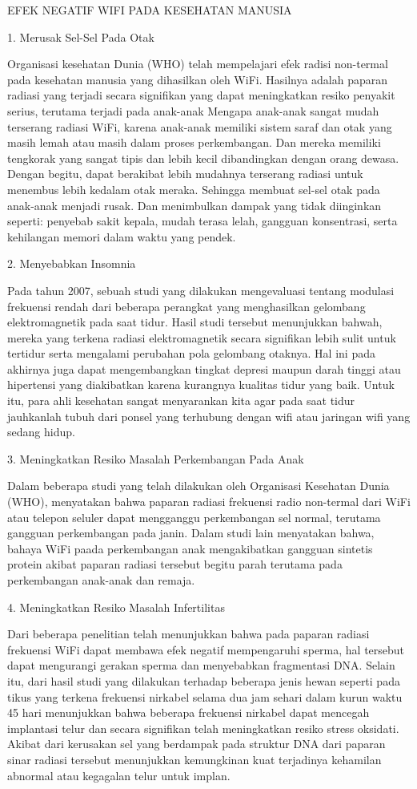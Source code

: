 EFEK NEGATIF WIFI PADA KESEHATAN MANUSIA

1. Merusak Sel-Sel Pada Otak
   
   Organisasi kesehatan Dunia (WHO) telah mempelajari efek radisi non-termal pada kesehatan manusia yang dihasilkan oleh WiFi. 
   Hasilnya adalah paparan radiasi yang terjadi secara signifikan yang dapat meningkatkan resiko penyakit serius, terutama terjadi pada anak-anak
   Mengapa anak-anak sangat mudah terserang radiasi WiFi, karena anak-anak memiliki sistem saraf dan otak yang masih lemah atau
   masih dalam proses perkembangan. Dan mereka memiliki tengkorak yang sangat tipis dan lebih kecil dibandingkan dengan orang dewasa. 
   Dengan begitu, dapat berakibat lebih mudahnya terserang radiasi untuk menembus lebih kedalam otak meraka. Sehingga membuat sel-sel
   otak pada anak-anak menjadi rusak. Dan menimbulkan dampak yang tidak diinginkan seperti: penyebab sakit kepala, mudah terasa lelah, gangguan 
   konsentrasi, serta kehilangan memori dalam waktu yang pendek.

2. Menyebabkan Insomnia

   Pada tahun 2007, sebuah studi yang dilakukan mengevaluasi tentang modulasi frekuensi rendah dari beberapa perangkat yang menghasilkan
   gelombang elektromagnetik pada saat tidur. Hasil studi tersebut menunjukkan bahwah, mereka yang terkena radiasi elektromagnetik secara
   signifikan lebih sulit untuk tertidur serta mengalami perubahan pola gelombang otaknya. Hal ini pada akhirnya juga dapat mengembangkan 
   tingkat depresi maupun darah tinggi atau hipertensi yang diakibatkan karena kurangnya kualitas tidur yang baik. Untuk itu, para ahli kesehatan
   sangat menyarankan kita agar pada saat tidur jauhkanlah tubuh dari ponsel yang terhubung dengan wifi atau jaringan wifi yang sedang hidup.

3. Meningkatkan Resiko Masalah Perkembangan Pada Anak

   Dalam beberapa studi yang telah dilakukan oleh Organisasi Kesehatan Dunia (WHO), menyatakan bahwa paparan radiasi frekuensi radio non-termal
   dari WiFi atau telepon seluler dapat mengganggu perkembangan sel normal, terutama gangguan perkembangan pada janin. Dalam studi lain
   menyatakan bahwa, bahaya WiFi paada perkembangan anak mengakibatkan gangguan sintetis protein akibat paparan radiasi tersebut begitu parah terutama
   pada perkembangan anak-anak dan remaja.

4. Meningkatkan Resiko Masalah Infertilitas

   Dari beberapa penelitian telah menunjukkan bahwa pada paparan radiasi frekuensi WiFi dapat membawa efek negatif mempengaruhi sperma, hal tersebut
   dapat mengurangi gerakan sperma dan menyebabkan fragmentasi DNA. Selain itu, dari hasil studi yang dilakukan terhadap beberapa jenis hewan seperti
   pada tikus yang terkena frekuensi nirkabel selama dua jam sehari dalam kurun waktu 45 hari menunjukkan bahwa beberapa frekuensi nirkabel dapat 
   mencegah implantasi telur dan secara signifikan telah meningkatkan resiko stress oksidati. Akibat dari kerusakan sel yang berdampak pada struktur
   DNA dari paparan sinar radiasi tersebut menunjukkan kemungkinan kuat terjadinya kehamilan abnormal atau kegagalan telur untuk implan.


